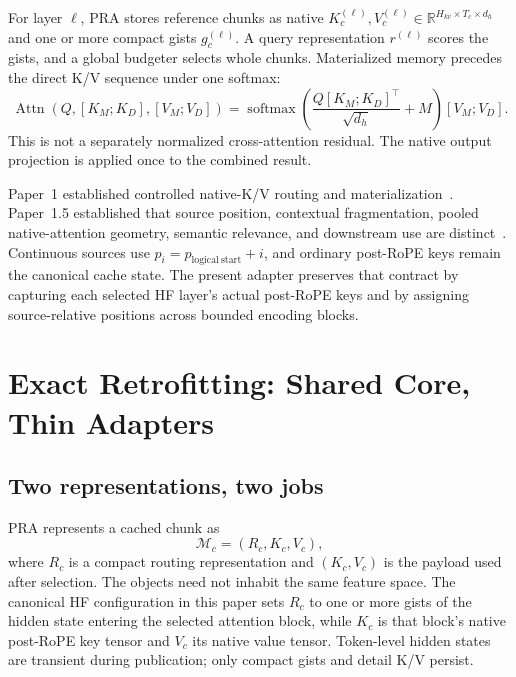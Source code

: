 \documentclass[11pt]{article}
\begin{document}
For layer $\ell$, PRA stores reference chunks as native
$K^{(\ell)}_c,V^{(\ell)}_c\in\mathbb{R}^{H_{kv}\times T_c\times d_h}$ and one or more compact
gists $g^{(\ell)}_c$. A query representation $r^{(\ell)}$ scores the gists, and a global
budgeter selects whole chunks. Materialized memory precedes the direct K/V sequence under one
softmax:
\begin{equation}
  \operatorname{Attn}(Q,[K_M;K_D],[V_M;V_D])
  = \operatorname{softmax}\!\left(\frac{Q[K_M;K_D]^\top}{\sqrt{d_h}}+M\right)[V_M;V_D].
\end{equation}
This is not a separately normalized cross-attention residual. The native output projection is
applied once to the combined result.

Paper~1 established controlled native-K/V routing and materialization~\cite{simao2026pra}.
Paper~1.5 established that source position, contextual fragmentation, pooled native-attention
geometry, semantic relevance, and downstream use are distinct~\cite{simao2026position}.
Continuous sources use
$p_i=p_{\mathrm{logical\ start}}+i$, and ordinary post-RoPE keys remain the canonical cache
state. The present adapter preserves that contract by capturing each selected HF layer's
actual post-RoPE keys and by assigning source-relative positions across bounded encoding
blocks.

\section{Exact Retrofitting: Shared Core, Thin Adapters}

\subsection{Two representations, two jobs}

PRA represents a cached chunk as
\begin{equation}
  \mathcal{M}_c=(R_c,K_c,V_c),
\end{equation}
where $R_c$ is a compact routing representation and $(K_c,V_c)$ is the payload used after
selection. The objects need not inhabit the same feature space. The canonical HF configuration
in this paper sets $R_c$ to one or more gists of the hidden state entering the selected
attention block, while $K_c$ is that block's native post-RoPE key tensor and $V_c$ its native
value tensor. Token-level hidden states are transient during publication; only compact gists
and detail K/V persist.
\end{document}
